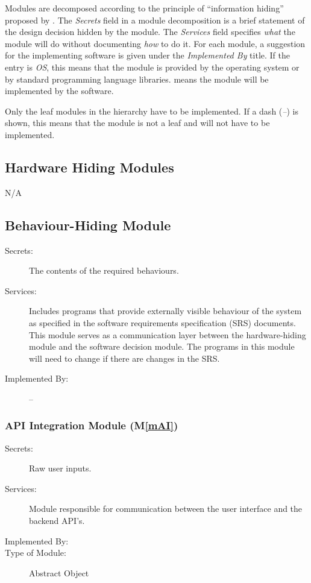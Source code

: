 \documentclass[12pt, titlepage]{article}
\newcommand{\mref}[1]{M\ref{#1}}
\begin{document}
Modules are decomposed according to the principle of ``information hiding''
proposed by \citet{ParnasEtAl1984}. The \emph{Secrets} field in a module
decomposition is a brief statement of the design decision hidden by the
module. The \emph{Services} field specifies \emph{what} the module will do
without documenting \emph{how} to do it. For each module, a suggestion for the
implementing software is given under the \emph{Implemented By} title. If the
entry is \emph{OS}, this means that the module is provided by the operating
system or by standard programming language libraries.
\emph{\progname{}} means the
module will be implemented by the \progname{} software.

Only the leaf modules in the hierarchy have to be implemented. If a dash
(\emph{--}) is shown, this means that the module is not a leaf and will not have
to be implemented.

\subsection{Hardware Hiding Modules}
\begin{description}
  \item[N/A]
\end{description}

\subsection{Behaviour-Hiding Module}

\begin{description}
  \item[Secrets:]The contents of the required behaviours.
  \item[Services:]Includes programs that provide externally visible behaviour of
    the system as specified in the software requirements specification (SRS)
    documents. This module serves as a communication layer between the
    hardware-hiding module and the software decision module. The
    programs in this
    module will need to change if there are changes in the SRS.
  \item[Implemented By:] --
\end{description}

\subsubsection{API Integration Module (\mref{mAI})}

\begin{description}
  \item[Secrets:] Raw user inputs.
  \item[Services:] Module responsible for communication between the
    user interface and the backend API's.
  \item[Implemented By:] \progname{}
  \item[Type of Module:] Abstract Object
\end{description}
\end{document}
